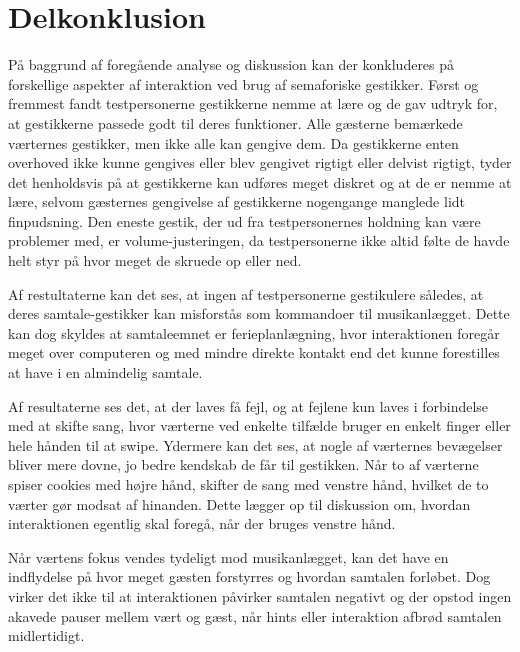 \section{Delkonklusion}
\label{SocialAcceptDelkonklusion}
%
På baggrund af foregående analyse og diskussion kan der konkluderes på forskellige aspekter af interaktion ved brug af semaforiske gestikker. Først og fremmest fandt testpersonerne gestikkerne nemme at lære og de gav udtryk for, at gestikkerne passede godt til deres funktioner. Alle gæsterne bemærkede værternes gestikker, men ikke alle kan gengive dem. Da gestikkerne enten overhoved ikke kunne gengives eller blev gengivet rigtigt eller delvist rigtigt, tyder det henholdsvis på at gestikkerne kan udføres meget diskret og at de er nemme at lære, selvom gæsternes gengivelse af gestikkerne nogengange manglede lidt finpudsning. Den eneste gestik, der ud fra testpersonernes holdning kan være problemer med, er volume-justeringen, da testpersonerne ikke altid følte de havde helt styr på hvor meget de skruede op eller ned. 

Af restultaterne kan det ses, at ingen af testpersonerne gestikulere således, at deres samtale-gestikker kan misforstås som kommandoer til musikanlægget. Dette kan dog skyldes at samtaleemnet er ferieplanlægning, hvor interaktionen foregår meget over computeren og med mindre direkte kontakt end det kunne forestilles at have i en almindelig samtale.

Af resultaterne ses det, at der laves få fejl, og at fejlene kun laves i forbindelse med at skifte sang, hvor værterne ved enkelte tilfælde bruger en enkelt finger eller hele hånden til at swipe. Ydermere kan det ses, at nogle af værternes bevægelser bliver mere dovne, jo bedre kendskab de får til gestikken. Når to af værterne spiser cookies med højre hånd, skifter de sang med venstre hånd, hvilket de to værter gør modsat af hinanden. Dette lægger op til diskussion om, hvordan interaktionen egentlig skal foregå, når der bruges venstre hånd.

Når værtens fokus vendes tydeligt mod musikanlægget, kan det have en indflydelse på hvor meget gæsten forstyrres og hvordan samtalen forløbet. Dog virker det ikke til at interaktionen påvirker samtalen negativt og der opstod ingen akavede pauser mellem vært og gæst, når hints eller interaktion afbrød samtalen midlertidigt. 

